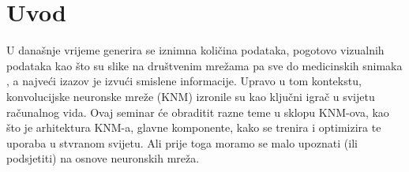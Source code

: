 
\chapter{Uvod}\label{ch:uvod}
U današnje vrijeme generira se iznimna količina podataka, pogotovo vizualnih podataka kao što su slike na društvenim mrežama pa sve do
medicinskih snimaka , a najveći izazov je izvući smislene informacije.
Upravo u tom kontekstu, konvolucijske neuronske mreže (KNM) izronile su kao ključni igrač u svijetu računalnog vida.
Ovaj seminar će obraditit razne teme u sklopu KNM-ova, kao što je arhitektura KNM-a, glavne komponente, kako se trenira i optimizira te uporaba u stvranom svijetu.
Ali prije toga moramo se malo upoznati (ili podsjetiti) na osnove neuronskih mreža.